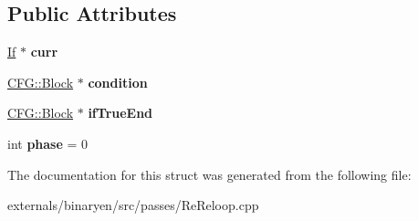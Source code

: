 \subsection*{Public Attributes}
\begin{DoxyCompactItemize}
\item 
\mbox{\label{structwasm_1_1_re_reloop_1_1_if_task_ad8757d06c4199c277f2325aaf37fb6dc}} 
\mbox{\hyperlink{classwasm_1_1_if}{If}} $\ast$ {\bfseries curr}
\item 
\mbox{\label{structwasm_1_1_re_reloop_1_1_if_task_a64135d3ee9f50db08d5e4a33da78da1b}} 
\mbox{\hyperlink{struct_c_f_g_1_1_block}{C\+F\+G\+::\+Block}} $\ast$ {\bfseries condition}
\item 
\mbox{\label{structwasm_1_1_re_reloop_1_1_if_task_a0a8141c0570957164d25542fae640d49}} 
\mbox{\hyperlink{struct_c_f_g_1_1_block}{C\+F\+G\+::\+Block}} $\ast$ {\bfseries if\+True\+End}
\item 
\mbox{\label{structwasm_1_1_re_reloop_1_1_if_task_a206f9ec9f5a3efbfc383bec11f7142e8}} 
int {\bfseries phase} = 0
\end{DoxyCompactItemize}


The documentation for this struct was generated from the following file\+:\begin{DoxyCompactItemize}
\item 
externals/binaryen/src/passes/Re\+Reloop.\+cpp\end{DoxyCompactItemize}
